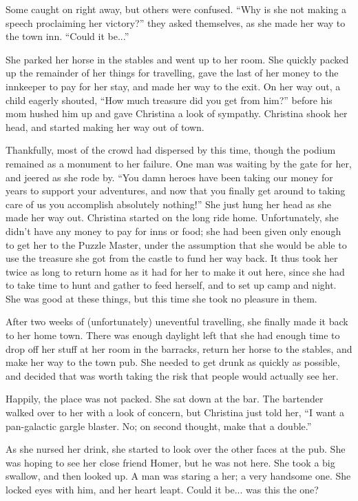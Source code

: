 Some caught on right away, but others were confused.  ``Why is she not making a speech proclaiming her victory?'' they asked themselves, as she made her way to the town inn.  ``Could it be...''

She parked her horse in the stables and went up to her room.  She quickly packed up the remainder of her things for travelling, gave the last of her money to the innkeeper to pay for her stay, and made her way to the exit.  On her way out, a child eagerly shouted, ``How much treasure did you get from him?'' before his mom hushed him up and gave Christina a look of sympathy.  Christina shook her head, and started making her way out of town.

Thankfully, most of the crowd had dispersed by this time, though the podium remained as a monument to her failure.  One man was waiting by the gate for her, and jeered as she rode by. ``You damn heroes have been taking our money for years to support your adventures, and now that you finally get around to taking care of us you accomplish absolutely nothing!''  She just hung her head as she made her way out.
Christina started on the long ride home.  Unfortunately, she didn't have any money to pay for inns or food;  she had been given only enough to get her to the Puzzle Master, under the assumption that she would be able to use the treasure she got from the castle to fund her way back.  It thus took her twice as long to return home as it had for her to make it out here, since she had to take time to hunt and gather to feed herself, and to set up camp and night.  She was good at these things, but this time she took no pleasure in them.

After two weeks of (unfortunately) uneventful travelling, she finally made it back to her home town.  There was enough daylight left that she had enough time to drop off her stuff at her room in the barracks, return her horse to the stables, and make her way to the town pub.  She needed to get drunk as quickly as possible, and decided that was worth taking the risk that people would actually see her.

Happily, the place was not packed.  She sat down at the bar.  The bartender walked over to her with a look of concern, but Christina just told her, ``I want a pan-galactic gargle blaster.  No; on second thought, make that a double.''

As she nursed her drink, she started to look over the other faces at the pub.  She was hoping to see her close friend Homer, but he was not here.  She took a big swallow, and then looked up.  A man was staring a her;  a very handsome one.  She locked eyes with him, and her heart leapt.  Could it be... was this the one?

